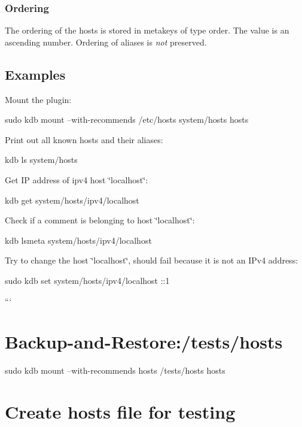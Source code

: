 \subsubsection*{Ordering}

The ordering of the hosts is stored in metakeys of type {\ttfamily order}. The value is an ascending number. Ordering of aliases is {\itshape not} preserved.

\subsection*{Examples}

Mount the plugin\+:


\begin{DoxyCode}
sudo kdb mount --with-recommends /etc/hosts system/hosts hosts
\end{DoxyCode}


Print out all known hosts and their aliases\+:


\begin{DoxyCode}
kdb ls system/hosts
\end{DoxyCode}


Get IP address of ipv4 host \char`\"{}localhost\char`\"{}\+:


\begin{DoxyCode}
kdb get system/hosts/ipv4/localhost
\end{DoxyCode}


Check if a comment is belonging to host \char`\"{}localhost\char`\"{}\+:


\begin{DoxyCode}
kdb lsmeta system/hosts/ipv4/localhost
\end{DoxyCode}


Try to change the host \char`\"{}localhost\char`\"{}, should fail because it is not an I\+Pv4 address\+:


\begin{DoxyCode}
sudo kdb set system/hosts/ipv4/localhost ::1
\end{DoxyCode}


``` \section*{Backup-\/and-\/\+Restore\+:/tests/hosts}

sudo kdb mount --with-\/recommends hosts /tests/hosts hosts

\section*{Create hosts file for testing}


